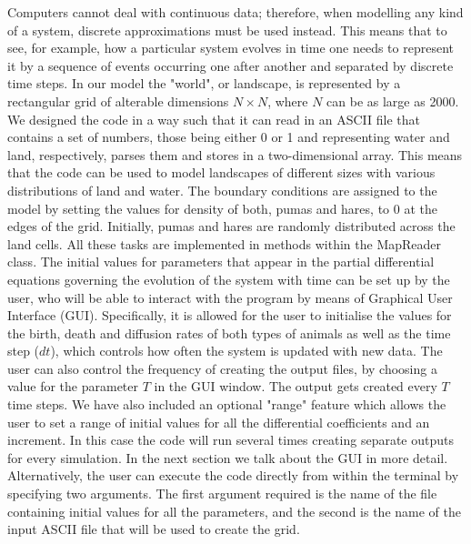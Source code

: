 \documentclass[11pt]{report}
\begin{document}
      Computers cannot deal with continuous data; therefore, when modelling any kind of a system, discrete approximations must be used instead. This means that to see, for example, how a particular system evolves in time one needs to represent it by a sequence of events occurring one after another and separated by discrete time steps. 
      \newline{}
      In our model the "world", or landscape, is represented by a rectangular grid of alterable dimensions $N \times N$, where $N$ can be as large as 2000.
      We designed the code in a way such that it can read in an ASCII file that contains a set of numbers, those being either 0 or 1 and representing water and land, respectively, parses them and stores in a two-dimensional array. This means that the code can be used to model landscapes of different sizes with various distributions of land and water.
      \newline{}
      The boundary conditions are assigned to the model by setting the values for density of both, pumas and hares, to 0 at the edges of the grid.  Initially, pumas and hares are randomly distributed across the land cells. 
      All these tasks are implemented in methods within the MapReader class.
      \newline{}
      The initial values for parameters that appear in the partial differential equations governing the evolution of the system with time can be set up by the user, who will be able to interact with the program by means of Graphical User Interface (GUI). Specifically, it is allowed for the user to initialise the values for the birth, death and diffusion rates of both types of animals as well as the time step ($dt$), which controls how often the system is updated with new data.  The user can also control the frequency of creating the output files, by choosing a value for the parameter $T$ in the GUI window. The output gets created every $T$ time steps. We have also included an optional "range" feature which allows the user to set a range of initial values for all the differential coefficients and an increment. In this case the code will run several times creating separate outputs for every simulation. In the next section we talk about the GUI in more detail. 
      \newline{}
      Alternatively, the user can execute the code directly from within the terminal by specifying two arguments. The first argument required is the name of the file containing initial values for all the parameters, and the second is the name of the input ASCII file that will be used to create the grid. 
      \newline{}
      \newline{}
      
\end{document}
